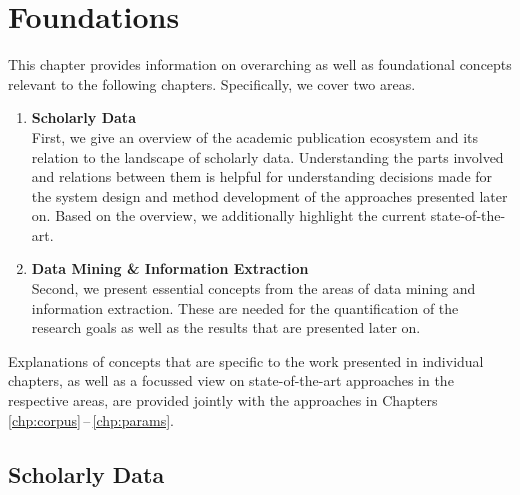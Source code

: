 \chapter{Foundations}
\label{chp:foundations}

This chapter provides information on overarching as well as foundational concepts relevant to the following chapters. Specifically, we cover two areas.

\begin{enumerate}
    \item \textbf{Scholarly Data}\\
        First, we give an overview of the academic publication ecosystem and its relation to the landscape of scholarly data. Understanding the parts involved and relations between them is helpful for understanding decisions made for the system design and method development of the approaches presented later on. Based on the overview, we additionally highlight the current state-of-the-art.
    \item \textbf{Data Mining \& Information Extraction}\\
        Second, we present essential concepts from the areas of data mining and information extraction. These are needed for the quantification of the research goals as well as the results that are presented later on.
\end{enumerate}

Explanations of concepts that are specific to the work presented in individual chapters, as well as a focussed view on state-of-the-art approaches in the respective areas, are provided jointly with the approaches in Chapters \ref{chp:corpus}\,--\,\ref{chp:params}.

\section{Scholarly Data}



